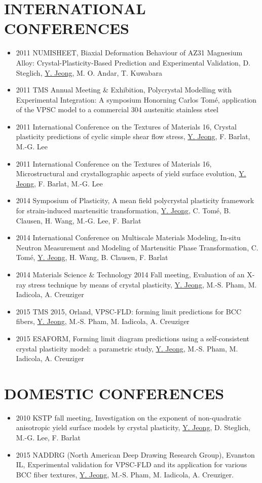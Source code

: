 \documentclass{res}
\begin{document}
\begin{resume}
  \section{INTERNATIONAL CONFERENCES}
  \begin{itemize}
  \item 2011 NUMISHEET, Biaxial Deformation Behaviour of AZ31 Magnesium Alloy: Crystal-Plasticity-Based Prediction and Experimental Validation, D. Steglich, \underline{Y. Jeong}, M. O. Andar, T. Kuwabara
  \item 2011 TMS Annual Meeting \& Exhibition, Polycrystal Modelling with Experimental Integration: A symposium Honorning Carlos Tom\'e, application of the VPSC model to a commercial 304 austenitic stainless steel
  \item 2011 International Conference on the Textures of Materials 16, Crystal plasticity predictions of cyclic simple shear flow stress, \underline{Y. Jeong}, F. Barlat, M.-G. Lee
  \item 2011 International Conference on the Textures of Materials 16, Microstructural and crystallographic aspects of yield surface evolution, \underline{Y. Jeong}, F. Barlat, M.-G. Lee
  \item 2014 Symposium of Plasticity, A mean field polycrystal plasticity framework for strain-induced martensitic transformation, \underline{Y. Jeong}, C. Tom\'{e}, B. Clausen, H. Wang, M.-G. Lee, F. Barlat
  \item 2014 International Conference on Multiscale Materials Modeling, In-situ Neutron  Measurement and Modeling of Martensitic Phase Transformation, C. Tom\'{e}, \underline{Y. Jeong}, H. Wang, B. Clausen, F. Barlat
  \item 2014 Materials Science \& Technology 2014 Fall meeting, Evaluation of an X-ray stress technique by means of crystal plasticity, \underline{Y. Jeong}, M.-S. Pham, M. Iadicola, A. Creuziger
  \item 2015 TMS 2015, Orland, VPSC-FLD: forming limit predictions for BCC fibers, \underline{Y. Jeong}, M.-S. Pham, M. Iadicola, A. Creuziger
  \item 2015 ESAFORM, Forming limit diagram predictions using a self-consistent crystal plasticity model: a parametric study, \underline{Y. Jeong}, M.-S. Pham, M. Iadicola, A. Creuziger
  \end{itemize}

  \section{DOMESTIC CONFERENCES}
  \begin{itemize}
  \item 2010 KSTP fall meeting, Investigation on the exponent of non-quadratic anisotropic yield surface models by crystal plasticity, \underline{Y. Jeong}, D. Steglich, M.-G. Lee, F. Barlat
  \item 2015 NADDRG (North American Deep Drawing Research Group), Evanston IL, Experimental validation for VPSC-FLD and its application for various BCC fiber textures, \underline{Y. Jeong}, M.-S. Pham, M. Iadicola, A. Creuziger.
  \end{itemize}


\end{resume}
\end{document}
